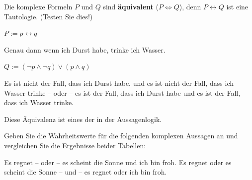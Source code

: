 \begin{frame}

Die komplexe Formeln $P$ und $Q$ sind \textbf{äquivalent} ($P \Leftrightarrow Q$), denn $P \leftrightarrow Q$ ist eine Tautologie. (Testen Sie dies!)

\begin{exe}

	 $P := p \leftrightarrow q$
	
	Genau dann wenn ich Durst habe, trinke ich Wasser.
	
	 $Q := ( \lnot p \land \lnot q) \lor (p \land q)$
	
	Es ist nicht der Fall, dass ich Durst habe, und es ist nicht der Fall, dass ich Wasser trinke -- oder -- es ist der Fall, dass ich Durst habe und es ist der Fall, dass ich Wasser trinke.
\end{exe}
	
Diese Äquivalenz ist eines der  in der Aussagenlogik.

\end{frame}


\begin{frame}

Geben Sie die Wahrheitswerte für die folgenden komplexen Aussagen an und vergleichen Sie die Ergebnisse beider Tabellen:

	
	\ea\label{ex:Equi3} Es regnet -- oder -- es scheint die Sonne und ich bin froh.
	\ex\label{ex:Equi4} Es regnet oder es scheint die Sonne -- und -- es regnet oder ich bin froh.
	\z 
	 	
\end{frame}


